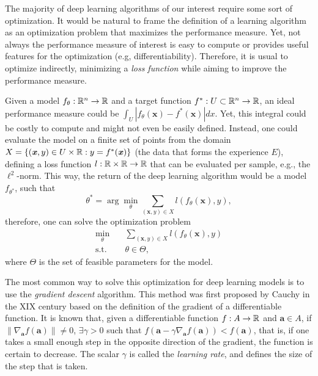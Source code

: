 The majority of deep learning algorithms of our interest require some sort of optimization.
It would be natural to frame the definition of a learning algorithm as an optimization problem that maximizes the performance measure.
Yet, not always the performance measure of interest is easy to compute or provides useful features for the optimization (e.g, differentiability).
Therefore, it is usual to optimize indirectly, minimizing a \textit{loss function} while aiming to improve the performance measure.

Given a model $f_\theta:\mathbb{R}^n\to\mathbb{R}$ and a target function $f^*:U\subset\mathbb{R}^n\to\mathbb{R}$, an ideal performance measure could be $\int_U |f_\theta(\bm{x}) - f^*(\bm{x})|dx$.
Yet, this integral could be costly to compute and might not even be easily defined.
Instead, one could evaluate the model on a finite set of points from the domain $X=\{(\textbf{\textit{x}},y)\in U\times\mathbb{R} : y=f^*(\textbf{\textit{x}})\}$ (the data that forms the experience $E$), defining a loss function $l:\mathbb{R}\times\mathbb{R}\to\mathbb{R}$ that can be evaluated per sample, e.g., the $\ell^2$-norm.
This way, the return of the deep learning algorithm would be a model $f_{\theta^*}$, such that \[
\theta^* = \arg\min_\theta \sum_{(\bm{x},y)\in X} l(f_\theta(\bm{x}), y)
,\] therefore, one can solve the optimization problem
\begin{align*}
    \min_\theta \quad & \sum_{(\bm{x},y)\in X} l(f_\theta(\bm{x}), y) \\
    \text{s.t.} \quad & \theta \in \Theta
,\end{align*}
where $\Theta$ is the set of feasible parameters for the model.

The most common way to solve this optimization for deep learning models is to use the \textit{gradient descent} algorithm.
This method was first proposed by Cauchy in the XIX century\cite{lemarechal_cauchy_2012} based on the definition of the gradient of a differentiable function.
It is known that, given a differentiable function $f:A\to\mathbb{R}$ and $\bm{a} \in A$, if $\| \nabla_{\bm{a}} f(\bm{a}) \| \neq 0$\footnotemark, $\exists \gamma > 0$ such that $f(\bm{a} - \gamma \nabla_{\bm{a}} f(\bm{a})) < f(\bm{a})$, that is, if one takes a small enough step in the opposite direction of the gradient, the function is certain to decrease.
The scalar $\gamma$ is called the \textit{learning rate}, and defines the size of the step that is taken\cite{goodfellow_deep_2016}.

